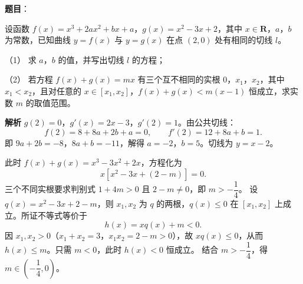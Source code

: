 \begin{answer}

\textbf{题目}：

设函数 $f(x)=x^3+2ax^2+bx+a$，$g(x)=x^2-3x+2$，其中 $x\in\mathbf R$，$a$，$b$ 为常数，已知曲线 $y=f(x)$ 与 $y=g(x)$ 在点 $(2,0)$ 处有相同的切线 $l$。

（1） 求 $a$，$b$ 的值，并写出切线 $l$ 的方程；

（2） 若方程 $f(x)+g(x)=mx$ 有三个互不相同的实根 $0$，$x_1$，$x_2$，其中 $x_1<x_2$，且对任意的 $x\in[x_1,x_2]$，$f(x)+g(x)<m(x-1)$ 恒成立，求实数 $m$ 的取值范围。

\textbf{解析}
$g(2)=0$，$g'(x)=2x-3$，$g'(2)=1$。由公共切线：
\nopagebreak[4]
\[f(2)=8+8a+2b+a=0,\qquad f'(2)=12+8a+b=1.\]
即 $9a+2b=-8$，$8a+b=-11$，解得 $a=-2$，$b=5$。切线为 $y=x-2$。

此时 $f(x)+g(x)=x^3-3x^2+2x$，方程化为
\nopagebreak[4]
\[x[x^2-3x+(2-m)]=0.\]
三个不同实根要求判别式 $1+4m>0$ 且 $2-m\neq0$，即 $m>-\dfrac14$。
设 $q(x)=x^2-3x+2-m$，则 $x_1,x_2$ 为 $q$ 的两根，$q(x)\leqslant0$ 在 $[x_1,x_2]$ 上成立。所证不等式等价于
\nopagebreak[4]
\[h(x)=xq(x)+m<0.\]
因 $x_1,x_2>0$（$x_1+x_2=3$，$x_1x_2=2-m>0$），故 $xq(x)\leqslant0$，从而 $h(x)\leqslant m$。只需 $m<0$，此时 $h(x)<0$ 恒成立。
结合 $m>-\dfrac14$，得 $m\in\left(-\dfrac14,0\right)$。



\end{answer}
